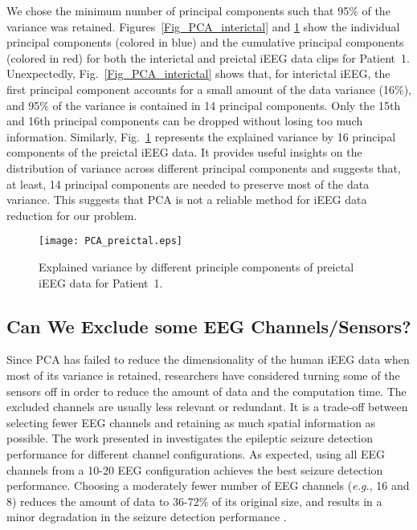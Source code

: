 \documentclass[journal]{IEEEtran}
\begin{document}
We chose the minimum number of principal components such that 95\% of the variance was retained. Figures~\ref{Fig_PCA_interictal} and \ref{Fig_PCA_preictal} show the individual principal components (colored in blue) and the cumulative principal components (colored in red) for both the interictal and preictal iEEG data clips for Patient~1. Unexpectedly, Fig.~\ref{Fig_PCA_interictal} shows that, for interictal iEEG, the first principal component accounts for a small amount of the data variance (16\%), and 95\% of the variance is contained in 14 principal components. Only the 15th and 16th principal components can be dropped without losing too much information. Similarly, Fig.~\ref{Fig_PCA_preictal} represents the explained variance by 16 principal components of the preictal iEEG data. It provides useful insights on the distribution of variance across different principal components and suggests that, at least, 14 principal components are needed to preserve most of the data variance. This suggests that PCA is not a reliable method for iEEG data reduction for our problem. 



\begin{figure}[!t]\centering
	\texttt{[image: PCA\_preictal.eps]}
	\caption{Explained variance by different principle components of preictal iEEG data for Patient~1.}
	\label{Fig_PCA_preictal}
\end{figure}

\subsection{Can We Exclude some EEG Channels/Sensors?}

Since PCA has failed to reduce the dimensionality of the human iEEG data when most of its variance is retained, researchers have considered turning some of the sensors off in order to reduce the amount of data and the computation time. The excluded channels are usually less relevant or redundant. It is a trade-off between selecting fewer EEG channels and retaining as much spatial information as possible. The work presented in \cite{shah2017optimizing} investigates the epileptic seizure detection performance for different channel configurations. As expected, using all EEG channels from a 10-20 EEG configuration achieves the best seizure detection performance. Choosing a moderately fewer number of EEG channels (\textit{e.g.}, 16 and 8) reduces the amount of data to 36-72\% of its original size, and results in a minor degradation in the seizure detection performance \cite{shah2017optimizing}.  
\end{document}

